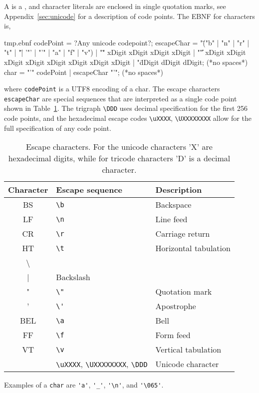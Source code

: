 A  is a  , and character literals are enclosed in single quotation marks, see Appendix~\ref{sec:unicode} for a description of code points. The EBNF for characters is,
%
\begin{verbatimwrite}{tmp.ebnf}
codePoint = ?Any unicode codepoint?;
escapeChar = 
  "\" ("b" | "n" | "r" | "t" | "\" | '"' | "'" | "a" | "f" | "v")
  | "\u" xDigit xDigit xDigit xDigit
  | "\U" xDigit xDigit xDigit xDigit xDigit xDigit xDigit xDigit
  | "\" dDigit dDigit dDigit;  (*no spaces*)
char = "'" codePoint | escapeChar "'"; (*no spaces*)
\end{verbatimwrite}
% 
where \lstinline[language=ebnf]!codePoint! is a UTF8 encoding of a char. The escape characters \lstinline[language=ebnf]{escapeChar} are special sequences that are interpreted as a single code point shown in Table~\ref{tab:escapeChar}. The trigraph \lstinline|\DDD| uses decimal specification for the first 256 code points, and the hexadecimal escape codes \lstinline|\uXXXX|, \lstinline|\UXXXXXXXX| allow for the full specification of any code point.
\begin{table}
  \centering
  \begin{tabular}{|c|l|l|}
    \hline
    \rowcolor{headerRowColor} Character& Escape sequence & Description\\
    \hline
    BS &\lstinline|\b|& Backspace\\
    LF &\lstinline|\n|&Line feed\\
    CR &\lstinline|\r|&Carriage return\\
    HT &\lstinline|\t|&Horizontal tabulation\\
    \textbackslash &\lstinline|\\|&Backslash\\
     " &\lstinline|\"|&Quotation mark\\
    ' &\lstinline|\'|&Apostrophe\\
    BEL&\lstinline|\a|& Bell\\
    FF&\lstinline|\f|&Form feed\\
    VT &\lstinline|\v|&Vertical tabulation\\
    &\lstinline|\uXXXX|, \lstinline|\UXXXXXXXX|, \lstinline|\DDD|&Unicode character\\
    \hline
  \end{tabular}
  \caption{Escape characters. For the unicode characters 'X' are hexadecimal digits, while for tricode characters 'D' is a decimal character.}
  \label{tab:escapeChar}
\end{table}
Examples of a \lstinline[language=ebnf]!char! are \lstinline{'a'}, \lstinline{'_'}, \lstinline{'\n'}, and \lstinline{'\065'}.

